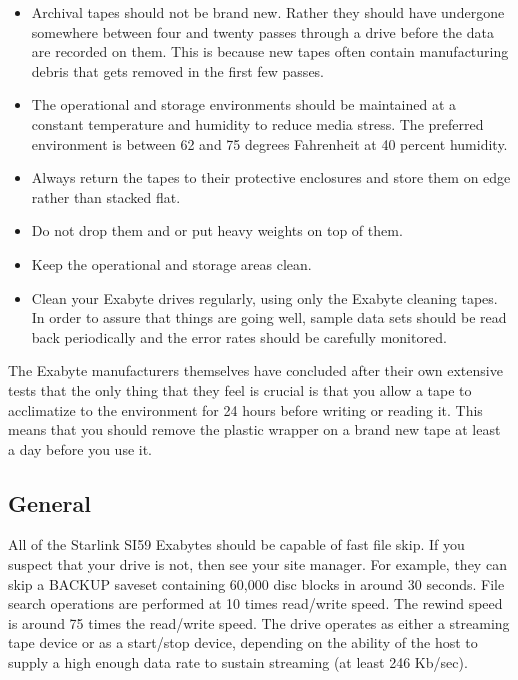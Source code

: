 \begin{itemize}

\item Archival tapes should not be brand new.  Rather they should have
undergone somewhere between four and twenty passes through a drive before the
data are recorded on them.  This is because new tapes often contain
manufacturing debris that gets removed in the first few passes.


\item The operational and storage environments should be maintained at a
constant temperature and humidity to reduce media stress.  The preferred
environment is between 62 and 75 degrees Fahrenheit at 40 percent humidity.  

\item Always return the tapes to their protective enclosures and store them on
edge rather than stacked flat.  

\item Do not drop them and or put heavy weights on top of them.  

\item Keep the operational and storage areas clean.  

\item Clean your Exabyte drives regularly, using only the Exabyte cleaning
tapes.  In order to assure that things are going well, sample data sets should
be read back periodically and the error rates should be carefully monitored.
 
\end{itemize}

The Exabyte manufacturers themselves have concluded after their own extensive
tests that the only thing that they feel is crucial is that you allow a tape to
acclimatize to the environment for 24 hours before writing or reading it.  This
means that you should remove the plastic wrapper on a brand new tape at least a
day before you use it.
 


\subsection{General}

All of the Starlink SI59 Exabytes should be capable of fast file skip. 
If you suspect that your drive is not, then see your site manager.
For example, they
can skip a BACKUP saveset containing 60,000 disc blocks in around 30 seconds.
File search operations are performed at 10 times read/write speed.
The rewind speed is around 75 times the read/write speed.
The drive operates as either a streaming tape device or as a start/stop
device, depending on the ability of the host to supply a high enough
data rate to sustain streaming (at least 246 Kb/sec).

